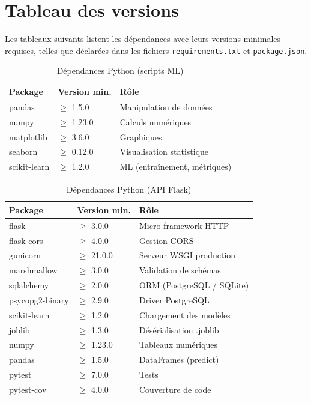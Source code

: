 \documentclass[12pt,a4paper,openany]{report}
\newcommand{\file}[1]{\texttt{#1}}
\begin{document}
\section{Tableau des versions}

Les tableaux suivants listent les dépendances avec leurs versions minimales requises, telles que déclarées dans les fichiers \file{requirements.txt} et \file{package.json}.

\begin{table}[H]
    \centering
    \caption{Dépendances Python (scripts ML)}
    \label{tab:deps-python-scripts}
    \begin{tabular}{l l l}
        \toprule
        \textbf{Package} & \textbf{Version min.} & \textbf{Rôle} \\
        \midrule
        pandas        & $\geq$ 1.5.0  & Manipulation de données \\
        numpy         & $\geq$ 1.23.0 & Calculs numériques \\
        matplotlib    & $\geq$ 3.6.0  & Graphiques \\
        seaborn       & $\geq$ 0.12.0 & Visualisation statistique \\
        scikit-learn  & $\geq$ 1.2.0  & ML (entraînement, métriques) \\
        \bottomrule
    \end{tabular}
\end{table}

\begin{table}[H]
    \centering
    \caption{Dépendances Python (API Flask)}
    \label{tab:deps-python-api}
    \begin{tabular}{l l l}
        \toprule
        \textbf{Package} & \textbf{Version min.} & \textbf{Rôle} \\
        \midrule
        flask            & $\geq$ 3.0.0  & Micro-framework HTTP \\
        flask-cors       & $\geq$ 4.0.0  & Gestion CORS \\
        gunicorn         & $\geq$ 21.0.0 & Serveur WSGI production \\
        marshmallow      & $\geq$ 3.0.0  & Validation de schémas \\
        sqlalchemy       & $\geq$ 2.0.0  & ORM (PostgreSQL / SQLite) \\
        psycopg2-binary  & $\geq$ 2.9.0  & Driver PostgreSQL \\
        scikit-learn     & $\geq$ 1.2.0  & Chargement des modèles \\
        joblib           & $\geq$ 1.3.0  & Désérialisation .joblib \\
        numpy            & $\geq$ 1.23.0 & Tableaux numériques \\
        pandas           & $\geq$ 1.5.0  & DataFrames (predict) \\
        pytest           & $\geq$ 7.0.0  & Tests \\
        pytest-cov       & $\geq$ 4.0.0  & Couverture de code \\
        \bottomrule
    \end{tabular}
\end{table}
\end{document}
